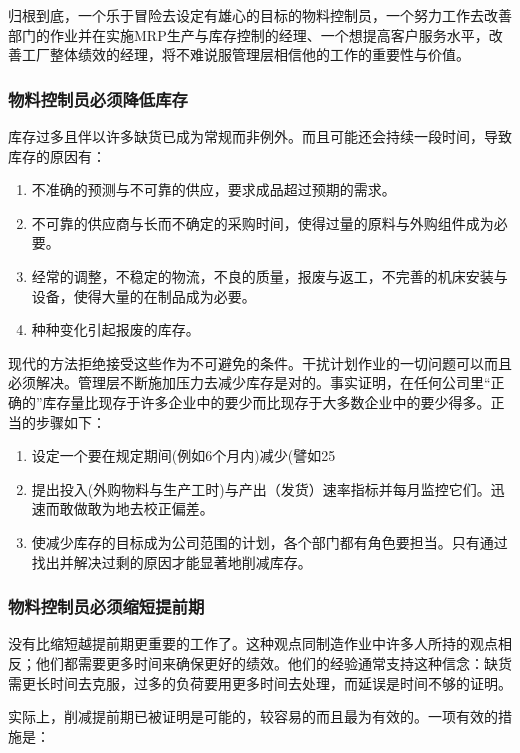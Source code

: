     归根到底，一个乐于冒险去设定有雄心的目标的物料控制员，一个努力工作去改善部门的作业并在实施MRP生产与库存控制的经理、一个想提高客户服务水平，改善工厂整体绩效的经理，将不难说服管理层相信他的工作的重要性与价值。

\subsubsection {物料控制员必须降低库存}

    库存过多且伴以许多缺货已成为常规而非例外。而且可能还会持续一段时间，导致库存的原因有：

    \begin{enumerate}
        \item  不准确的预测与不可靠的供应，要求成品超过预期的需求。
        \item  不可靠的供应商与长而不确定的采购时间，使得过量的原料与外购组件成为必要。
        \item  经常的调整，不稳定的物流，不良的质量，报废与返工，不完善的机床安装与设备，使得大量的在制品成为必要。
        \item  种种变化引起报废的库存。
    \end{enumerate}

    现代的方法拒绝接受这些作为不可避免的条件。干扰计划作业的一切问题可以而且必须解决。管理层不断施加压力去减少库存是对的。事实证明，在任何公司里“正确的”库存量比现存于许多企业中的要少而比现存于大多数企业中的要少得多。正当的步骤如下：
    \begin{enumerate}
        \item  设定一个要在规定期间(例如6个月内)减少(譬如25%
        \item  提出投入(外购物料与生产工时)与产出（发货）速率指标并每月监控它们。迅速而敢做敢为地去校正偏差。
        \item  使减少库存的目标成为公司范围的计划，各个部门都有角色要担当。只有通过找出并解决过剩的原因才能显著地削减库存。
    \end{enumerate}

\subsubsection {物料控制员必须缩短提前期}

    没有比缩短越提前期更重要的工作了。这种观点同制造作业中许多人所持的观点相反；他们都需要更多时间来确保更好的绩效。他们的经验通常支持这种信念：缺货需更长时间去克服，过多的负荷要用更多时间去处理，而延误是时间不够的证明。

    实际上，削减提前期已被证明是可能的，较容易的而且最为有效的。一项有效的措施是：

